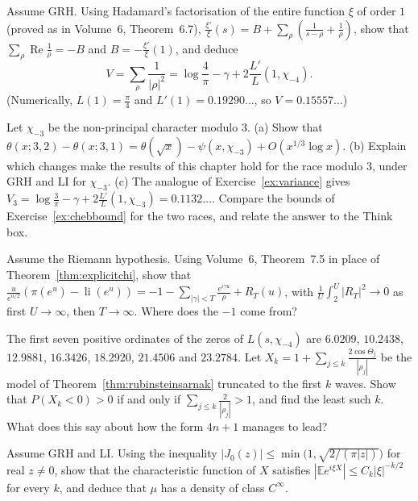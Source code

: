 \begin{exercise}[$\star\star\star$]\label{ex:variance}
Assume GRH. Using Hadamard's factorisation of the entire function $\xi$ of order $1$ (proved as in Volume~6, Theorem~6.7), $\frac{\xi'}\xi(s)=B+\sum_\rho(\frac1{s-\rho}+\frac1\rho)$, show that $\sum_\rho\operatorname{Re}\frac1\rho=-B$ and $B=-\frac{\xi'}\xi(1)$, and deduce
\[
V=\sum_\rho\frac1{|\rho|^2}=\log\frac4\pi-\gamma+2\frac{L'}L(1,\chi_{-4}).
\]
(Numerically, $L(1)=\frac\pi4$ and $L'(1)=0.19290\ldots$, so $V=0.15557\ldots$)
\end{exercise}

\begin{exercise}[$\star\star$]\label{ex:mod3}
Let $\chi_{-3}$ be the non-principal character modulo $3$. (a) Show that $\theta(x;3,2)-\theta(x;3,1)=\theta(\sqrt x)-\psi(x,\chi_{-3})+O(x^{1/3}\log x)$. (b) Explain which changes make the results of this chapter hold for the race modulo $3$, under GRH and LI for $\chi_{-3}$. (c) The analogue of Exercise~\ref{ex:variance} gives $V_3=\log\frac3\pi-\gamma+2\frac{L'}L(1,\chi_{-3})=0.1132\ldots$. Compare the bounds of Exercise~\ref{ex:chebbound} for the two races, and relate the answer to the Think box.
\end{exercise}

\begin{exercise}[$\star\star$]\label{ex:li}
Assume the Riemann hypothesis. Using Volume~6, Theorem~7.5 in place of Theorem~\ref{thm:explicitchi}, show that $\frac u{e^{u/2}}(\pi(e^u)-\operatorname{li}(e^u))=-1-\sum_{|\gamma|<T}\frac{e^{i\gamma u}}\rho+R_T(u)$, with $\frac1U\int_2^U|R_T|^2\to0$ as first $U\to\infty$, then $T\to\infty$. Where does the $-1$ come from?
\end{exercise}

\begin{exercise}[$\star$]\label{ex:fewwaves}
The first seven positive ordinates of the zeros of $L(s,\chi_{-4})$ are $6.0209$, $10.2438$, $12.9881$, $16.3426$, $18.2920$, $21.4506$ and $23.2784$. Let $X_k=1+\sum_{j\le k}\frac{2\cos\Theta_j}{|\rho_j|}$ be the model of Theorem~\ref{thm:rubinsteinsarnak} truncated to the first $k$ waves. Show that $P(X_k<0)>0$ if and only if $\sum_{j\le k}\frac2{|\rho_j|}>1$, and find the least such $k$. What does this say about how the form $4n+1$ manages to lead?
\end{exercise}

\begin{exercise}[$\star\star$]\label{ex:smoothdensity}
Assume GRH and LI. Using the inequality $|J_0(z)|\le\min\bigl(1,\sqrt{2/(\pi|z|)}\bigr)$ for real $z\ne0$, show that the characteristic function of $X$ satisfies $|\mathbb Ee^{i\xi X}|\le C_k|\xi|^{-k/2}$ for every $k$, and deduce that $\mu$ has a density of class $C^\infty$.
\end{exercise}

